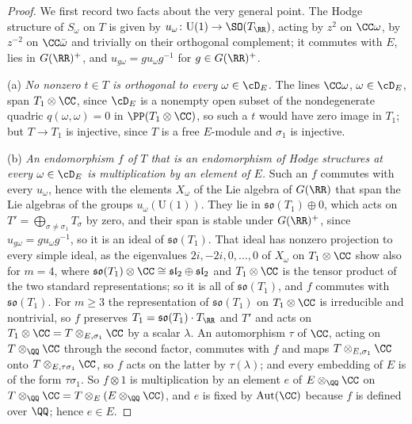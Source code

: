 \begin{proof}
We first record two facts about the very general point. The Hodge structure
of $S_{\omega}$ on $T$ is given by
$u_{\omega}\colon\mathrm{U}(1)\to\SO(T_{\RR})$, acting by $z^{2}$ on
$\CC\omega$, by $z^{-2}$ on $\CC\bar\omega$ and trivially on their orthogonal
complement; it commutes with $E$, lies in $G(\RR)^{+}$, and
$u_{g\omega}=gu_{\omega}g^{-1}$ for $g\in G(\RR)^{+}$.

(a) \emph{No nonzero $t\in T$ is orthogonal to every $\omega\in\cD_{E}$.} The
lines $\CC\omega$, $\omega\in\cD_{E}$, span $T_{1}\otimes\CC$, since
$\cD_{E}$ is a nonempty open subset of the nondegenerate quadric
$q(\omega,\omega)=0$ in $\PP(T_{1}\otimes\CC)$, so such a $t$
would have zero image in $T_{1}$; but $T\to T_{1}$ is injective, since $T$ is
a free $E$-module and $\sigma_{1}$ is injective.

(b) \emph{An endomorphism $f$ of $T$ that is an endomorphism of Hodge
structures at every $\omega\in\cD_{E}$ is multiplication by an element of
$E$.} Such an $f$ commutes with every $u_{\omega}$, hence with the elements
$X_{\omega}$ of the Lie algebra of $G(\RR)$ that span the Lie algebras of
the groups $u_{\omega}(\mathrm{U}(1))$. They lie in
$\mathfrak{so}(T_{1})\oplus0$, which acts on
$T'=\bigoplus_{\sigma\ne\sigma_{1}}T_{\sigma}$ by zero, and their span is
stable under $G(\RR)^{+}$, since $u_{g\omega}=gu_{\omega}g^{-1}$, so it is an
ideal of $\mathfrak{so}(T_{1})$. That ideal has nonzero projection to every
simple ideal, as the eigenvalues $2i,-2i,0,\dots,0$ of $X_{\omega}$ on
$T_{1}\otimes\CC$ show also for $m=4$, where
$\mathfrak{so}(T_{1})\otimes\CC\cong\mathfrak{sl}_{2}\oplus\mathfrak{sl}_{2}$
and $T_{1}\otimes\CC$ is the tensor product of the two standard
representations; so it is all of $\mathfrak{so}(T_{1})$, and $f$ commutes
with $\mathfrak{so}(T_{1})$. For $m\ge3$ the representation of
$\mathfrak{so}(T_{1})$ on $T_{1}\otimes\CC$ is irreducible and nontrivial, so
$f$ preserves $T_{1}=\mathfrak{so}(T_{1})\cdot T_{\RR}$ and $T'$ and acts on
$T_{1}\otimes\CC=T\otimes_{E,\sigma_{1}}\CC$ by a scalar $\lambda$. An
automorphism $\tau$ of $\CC$, acting on $T\otimes_{\QQ}\CC$ through the
second factor, commutes with $f$ and maps $T\otimes_{E,\sigma_{1}}\CC$ onto
$T\otimes_{E,\tau\sigma_{1}}\CC$, so $f$ acts on the latter by
$\tau(\lambda)$; and every embedding of $E$ is of the form $\tau\sigma_{1}$.
So $f\otimes1$ is multiplication by an element $e$ of $E\otimes_{\QQ}\CC$ on
$T\otimes_{\QQ}\CC=T\otimes_{E}(E\otimes_{\QQ}\CC)$, and $e$ is fixed by
$\mathrm{Aut}(\CC)$ because $f$ is defined over $\QQ$; hence $e\in E$.


\end{proof}

